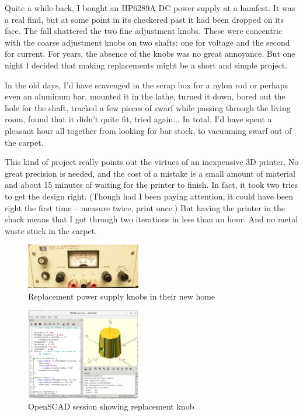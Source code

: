 \documentclass[12pt, twocolumn]{article}
\begin{document}
Quite a while back, I bought an HP6289A DC power supply at a hamfest.
It was a real find, but at some point in its checkered past it had
been dropped on its face.  The fall shattered the two fine adjustment
knobs.  These were concentric with the coarse adjustment knobs on two
shafts: one for voltage and the second for current.  For years, the
absence of the knobs was no great annoyance. But one night I decided
that making replacements might be a short and simple project.


In the old days, I'd have scavenged in the scrap box for a nylon rod
or perhaps even an aluminum bar, mounted it in the lathe, turned it down,
bored out the hole for the shaft, tracked a few pieces of swarf while
passing through the living room, found that it didn't quite fit, tried
again... In total, I'd have spent a pleasant hour all together from
looking for bar stock, to vacuuming swarf out of the carpet.

This kind of project really points out the virtues of an inexpensive
3D printer.  No great precision is needed, and the cost of a mistake
is a small amount of material and about 15 minutes of waiting for the
printer to finish. 
In fact, it took two tries to get the design right. (Though had I
been paying attention, it could have been right the first time --
measure twice, print once.) But having the printer in the shack
means that I got through two iterations in less than an hour.
And no metal waste stuck in the carpet. 


\begin{figure}
  \centering
  \includegraphics[width=5cm]{PSKnobs.jpg}
  \caption{Replacement power supply knobs in their new home}
\end{figure}

\begin{figure}
  \centering
  \includegraphics[width=5cm]{PSKnob_OpenSCAD.png}
  \caption{OpenSCAD session showing replacement knob}
\end{figure}
\end{document}
